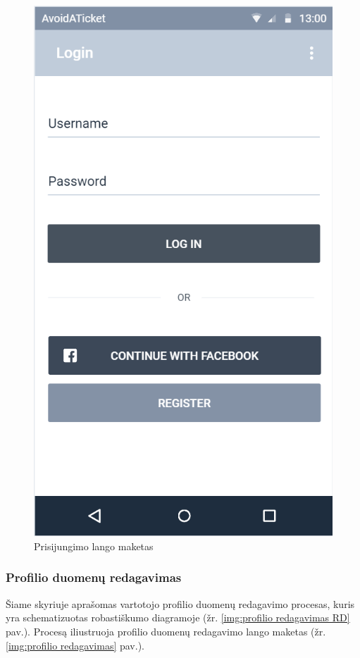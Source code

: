 \documentclass{VUMIFPSkursinis}
\begin{document}
	\begin{figure}[H]
				\centering
				\includegraphics[scale=0.3]{img/mockup_login}
				\caption{Prisijungimo lango maketas}
				\label{img:prisijungimas}
			\end{figure}

\subsubsection{Profilio duomenų redagavimas}
	Šiame skyriuje aprašomas vartotojo profilio duomenų redagavimo procesas, kuris yra schematizuotas robastiškumo diagramoje (žr. \ref{img:profilio redagavimas RD} pav.). 
	Procesą iliustruoja profilio duomenų redagavimo lango maketas (žr. \ref{img:profilio redagavimas} pav.).
\end{document}
